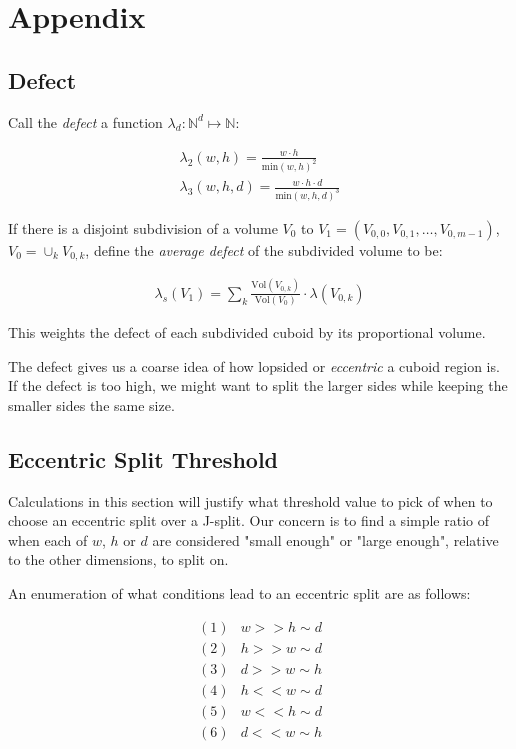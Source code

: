 
\clearpage

\section{Appendix}


\subsection{Defect} \label{appendix:defect}

Call the \textit{defect} a function $\lambda _ d : \mathbb{N}^d \mapsto \mathbb{N}$:

$$
\begin{array}{l}
\lambda _ 2 (w,h) = \frac{ w \cdot h }{ \text{min}(w,h)^2 } \\
\lambda _ 3 (w,h,d) = \frac{ w \cdot h \cdot d }{ \text{min}(w,h,d)^3 }
\end{array}
$$

If there is a disjoint subdivision of a volume $V_0$ to $V_1  = ( V _ {0,0}, V _ {0,1}, \dots, V _ {0,m-1} )$,
$V _ 0  = \cup _ {k} V _ {0,k}$,
define the \textit{average defect} of the subdivided volume to be:

$$
\begin{array}{l}
  \lambda _ {s} ( V _ 1 ) = \sum _ {k} \frac{ \text{Vol}(V _ {0,k}) }{ \text{Vol}( V _ 0 ) } \cdot \lambda( V _ {0,k} )
\end{array}
$$

This weights the defect of each subdivided cuboid by its proportional volume.

The defect gives us a coarse idea of how lopsided or \textit{eccentric} a cuboid region is.
If the defect is too high, we might want to split the larger sides while keeping the smaller sides the same size.

\subsection{Eccentric Split Threshold}

Calculations in this section will justify what threshold value to pick of when to choose an
eccentric split over a J-split.
Our concern is to find a simple ratio of when each of $w$, $h$ or $d$ are considered
"small enough" or "large enough", relative to the other dimensions, to split on.

An enumeration of what conditions lead to an eccentric split are as follows:

$$
\begin{array}{ll}
  (1) & w >> h \sim d \\
  (2) & h >> w \sim d \\
  (3) & d >> w \sim h \\
  (4) & h << w \sim d \\
  (5) & w << h \sim d \\
  (6) & d << w \sim h \\
\end{array}
$$

